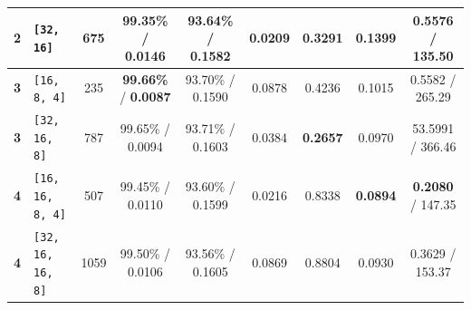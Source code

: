 \documentclass{article}
\begin{document}
\begin{table}[H]
{\begin{tabular}{clccccccc}
\textbf{2} & \texttt{[32, 16]} & 675 & 99.35\% / 0.0146 & 93.64\% / \textbf{0.1582} & 0.0209 & 0.3291 & 0.1399 & 0.5576 / 135.50 \\
\midrule
\textbf{3} & \texttt{[16, 8, 4]} & 235 & \textbf{99.66\%} / \textbf{0.0087} & 93.70\% / 0.1590 & 0.0878 & 0.4236 & 0.1015 & 0.5582 / 265.29 \\
\textbf{3} & \texttt{[32, 16, 8]} & 787 & 99.65\% / 0.0094 & 93.71\% / 0.1603 & 0.0384 & \textbf{0.2657} & 0.0970 & 53.5991 / 366.46 \\
\midrule
\textbf{4} & \texttt{[16, 16, 8, 4]} & 507 & 99.45\% / 0.0110 & 93.60\% / 0.1599 & 0.0216 & 0.8338 & \textbf{0.0894} & \textbf{0.2080} / 147.35 \\
\textbf{4} & \texttt{[32, 16, 16, 8]} & 1059 & 99.50\% / 0.0106 & 93.56\% / 0.1605 & 0.0869 & 0.8804 & 0.0930 & 0.3629 / 153.37 \\
\bottomrule
\end{tabular}%
}
\end{table}
\end{document}
